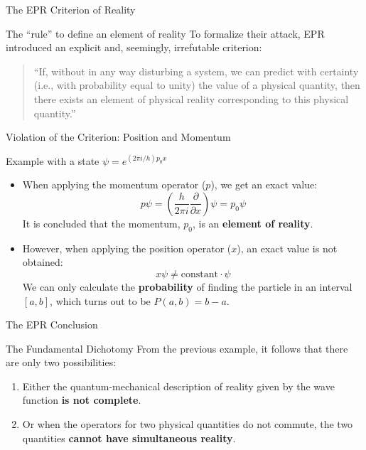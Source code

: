 \begin{frame}{The EPR Criterion of Reality}

  \begin{block}{The ``rule'' to define an element of reality}
    To formalize their attack, EPR introduced an explicit and, seemingly, irrefutable criterion:
  \end{block}
  \pause %

  \begin{quote}
    ``If, without in any way disturbing a system, we can predict with certainty (i.e., with probability equal to unity) the value of a physical quantity, then there exists an element of physical reality corresponding to this physical quantity.''
  \end{quote}

\end{frame}

\begin{frame}{Violation of the Criterion: Position and Momentum}

  \begin{block}{Example with a state $\psi = e^{(2\pi i/h)p_0x}$}
    \begin{itemize}[<+->] %
      \item When applying the momentum operator ($p$), we get an exact value:
      $$ p\psi = \left(\frac{h}{2\pi i}\frac{\partial}{\partial x}\right)\psi = p_0\psi $$
      It is concluded that the momentum, $p_0$, is an \textbf{element of reality}.
      \item However, when applying the position operator ($x$), an exact value is not obtained:
      $$ x\psi \neq \text{constant} \cdot \psi $$
      We can only calculate the \textbf{probability} of finding the particle in an interval $[a, b]$, which turns out to be $P(a,b) = b-a$.
    \end{itemize}
  \end{block}

\end{frame}

\begin{frame}{The EPR Conclusion}

  \begin{alertblock}{The Fundamental Dichotomy}
    From the previous example, it follows that there are only two possibilities:
    \begin{enumerate}[<+->] %
        \item Either the quantum-mechanical description of reality given by the wave function \textbf{is not complete}.
        \item Or when the operators for two physical quantities do not commute, the two quantities \textbf{cannot have simultaneous reality}.
    \end{enumerate}
  \end{alertblock}
\end{frame}

